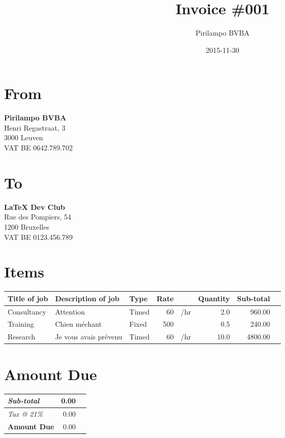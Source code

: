 \documentclass[a4paper,table]{article}
\author{Pirilampo BVBA}
\date{2015-11-30}
\title{Invoice \#001}
\begin{document}
\maketitle

\section*{From}
\label{sec:orgheadline1}

\textbf{Pirilampo BVBA} \\
Henri Regastraat, 3 \\
3000 Leuven \\
VAT BE 0642.789.702

\section*{To}
\label{sec:orgheadline2}

\textbf{\LaTeX{} Dev Club} \\
Rue des Pompiers, 54 \\
1200 Bruxelles \\
VAT BE 0123.456.789

\section*{Items}
\label{sec:orgheadline3}

\extrarowsep=1mm

\begin{center}
\label{tab:orgtable1}

\begin{tabu}{lXlrlrrl}
Title of job & Description of job & Type & Rate &  & Quantity & Sub-total & \\
\hline
Consultancy & Attention & Timed & 60 & \texteuro{}/hr & 2.0 & 960.00 & \texteuro{}\\
Training & Chien méchant & Fixed & 500 & \texteuro{} & 0.5 & 240.00 & \texteuro{}\\
Research & Je vous avais prévenu & Timed & 60 & \texteuro{}/hr & 10.0 & 4800.00 & \texteuro{}\\
\end{tabu}
\end{center}

\section*{Amount Due}
\label{sec:orgheadline4}

\hfill\colorbox{prlp-light-gray}{\begin{minipage}{7.5cm}
\begin{center}
\begin{tabu}{Xrl}
\emph{Sub-total} & 0.00 & \texteuro{}\\
\hline
\emph{Tax @ 21\%} & 0.00 & \texteuro{}\\
\hline
\textbf{Amount Due} & 0.00 & \textbf{\texteuro{}}\\
\end{tabu}
\end{center}

\end{minipage}}
\end{document}
